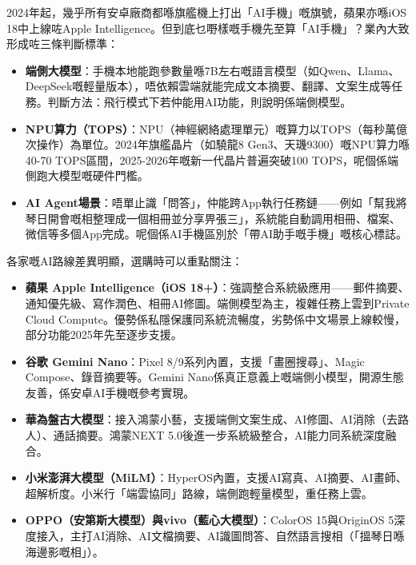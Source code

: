 


2024年起，幾乎所有安卓廠商都喺旗艦機上打出「AI手機」嘅旗號，蘋果亦喺iOS 18中上線咗Apple Intelligence。但到底乜嘢樣嘅手機先至算「AI手機」？業內大致形成咗三條判斷標準：

\begin{itemize}
  \item \textbf{端側大模型}：手機本地能跑參數量喺7B左右嘅語言模型（如Qwen、Llama、DeepSeek嘅輕量版本），唔依賴雲端就能完成文本摘要、翻譯、文案生成等任務。判斷方法：飛行模式下若仲能用AI功能，則說明係端側模型。
  \item \textbf{NPU算力（TOPS）}：NPU（神經網絡處理單元）嘅算力以TOPS（每秒萬億次操作）為單位。2024年旗艦晶片（如驍龍8 Gen3、天璣9300）嘅NPU算力喺40-70 TOPS區間，2025-2026年嘅新一代晶片普遍突破100 TOPS，呢個係端側跑大模型嘅硬件門檻。
  \item \textbf{AI Agent場景}：唔單止識「問答」，仲能跨App執行任務鏈——例如「幫我將琴日開會嘅相整理成一個相冊並分享畀張三」，系統能自動調用相冊、檔案、微信等多個App完成。呢個係AI手機區別於「帶AI助手嘅手機」嘅核心標誌。
\end{itemize}


各家嘅AI路線差異明顯，選購時可以重點關注：

\begin{itemize}
  \item \textbf{蘋果 Apple Intelligence（iOS 18+）}：強調整合系統級應用——郵件摘要、通知優先級、寫作潤色、相冊AI修圖。端側模型為主，複雜任務上雲到Private Cloud Compute。優勢係私隱保護同系統流暢度，劣勢係中文場景上線較慢，部分功能2025年先至逐步支援。
  \item \textbf{谷歌 Gemini Nano}：Pixel 8/9系列內置，支援「畫圈搜尋」、Magic Compose、錄音摘要等。Gemini Nano係真正意義上嘅端側小模型，開源生態友善，係安卓AI手機嘅參考實現。
  \item \textbf{華為盤古大模型}：接入鴻蒙小藝，支援端側文案生成、AI修圖、AI消除（去路人）、通話摘要。鴻蒙NEXT 5.0後進一步系統級整合，AI能力同系統深度融合。
  \item \textbf{小米澎湃大模型（MiLM）}：HyperOS內置，支援AI寫真、AI摘要、AI畫師、超解析度。小米行「端雲協同」路線，端側跑輕量模型，重任務上雲。
  \item \textbf{OPPO（安第斯大模型）與vivo（藍心大模型）}：ColorOS 15與OriginOS 5深度接入，主打AI消除、AI文檔摘要、AI識圖問答、自然語言搜相（「搵琴日喺海邊影嘅相」）。
\end{itemize}

